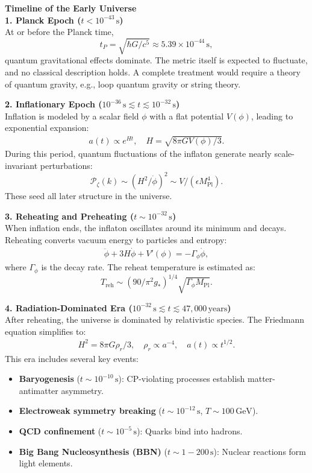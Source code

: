 \begin{technical}
{\Large\textbf{Timeline of the Early Universe}}\\[0.2em]

\noindent\textbf{1. Planck Epoch \boldmath(\( t < 10^{-43} \, \text{s} \))}\\[0.3em]
At or before the Planck time,
\[
t_P = \sqrt{\hbar G/c^5} \approx 5.39 \times 10^{-44} \, \text{s},
\]
quantum gravitational effects dominate. The metric itself is expected to fluctuate, and no classical description holds. A complete treatment would require a theory of quantum gravity, e.g., loop quantum gravity or string theory.

\noindent\textbf{2. Inflationary Epoch \boldmath(\(10^{-36} \, \text{s} \lesssim t \lesssim 10^{-32} \, \text{s} \))}\\[0.3em]
Inflation is modeled by a scalar field \(\phi\) with a flat potential \(V(\phi)\), leading to exponential expansion:
\begin{align}
a(t) \propto e^{H t}, \quad H = \sqrt{8\pi G V(\phi)/3}.
\end{align}
During this period, quantum fluctuations of the inflaton generate nearly scale-invariant perturbations:
\[
\mathcal{P}_\zeta(k) \sim (H^2/\dot{\phi})^2 \sim V/(\epsilon M_{\text{Pl}}^4).
\]
These seed all later structure in the universe.

\noindent\textbf{3. Reheating and Preheating \boldmath(\( t \sim 10^{-32} \, \text{s} \))}\\[0.3em]
When inflation ends, the inflaton oscillates around its minimum and decays. Reheating converts vacuum energy to particles and entropy:
\begin{align}
\ddot{\phi} + 3H\dot{\phi} + V'(\phi) = -\Gamma_\phi \dot{\phi},
\end{align}
where \(\Gamma_\phi\) is the decay rate. The reheat temperature is estimated as:
\[
T_{\text{reh}} \sim (90/\pi^2 g_*)^{1/4} \sqrt{\Gamma_\phi M_{\text{Pl}}}.
\]

\noindent\textbf{4. Radiation-Dominated Era \boldmath(\( 10^{-32} \, \text{s} \lesssim t \lesssim 47{,}000 \, \text{years} \))}\\[0.3em]
After reheating, the universe is dominated by relativistic species. The Friedmann equation simplifies to:
\begin{align}
H^2 = 8\pi G \rho_r/3, \quad \rho_r \propto a^{-4}, \quad a(t) \propto t^{1/2}.
\end{align}
This era includes several key events:
\begin{itemize}
\item \textbf{Baryogenesis} (\( t \sim 10^{-10} \, \text{s} \)): CP-violating processes establish matter-antimatter asymmetry.
\item \textbf{Electroweak symmetry breaking} (\( t \sim 10^{-12} \, \text{s} \), \( T \sim 100\,\text{GeV} \)).
\item \textbf{QCD confinement} (\( t \sim 10^{-5} \, \text{s} \)): Quarks bind into hadrons.
\item \textbf{Big Bang Nucleosynthesis (BBN)} (\( t \sim 1 - 200 \, \text{s} \)): Nuclear reactions form light elements.
\end{itemize}


\end{technical}
